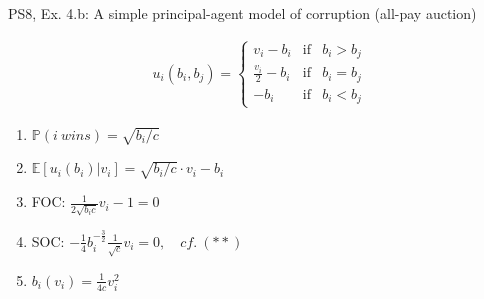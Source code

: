 \begin{frame}{PS8, Ex. 4.b: A simple principal-agent model of corruption (all-pay auction)}
\begin{multicols}{2}
\begin{align*}
        u_i(b_i,b_j)=\left\{\begin{array}{lcl}
          v_i-b_i           & \text{if} & b_i>b_j \\
          \frac{v_i}{2}-b_i & \text{if} & b_i=b_j \\
          -b_i              & \text{if} & b_i<b_j
        \end{array}\right.
      \end{align*} \vspace{-16pt}
      \begin{enumerate}
        \item $\mathbb{P}(i\ wins)=\sqrt{b_i/c}$
        \item $\mathbb{E}[u_i(b_i)|v_i]=\sqrt{b_i/c}\cdot v_i-b_i$
        \item FOC: $\frac{1}{2\sqrt{b_ic}}v_i-1=0$
        \item[] SOC: $-\frac{1}{4}b_i^{-\frac{3}{2}}\frac{1}{\sqrt{c}}v_i=0,\quad cf.\ (**)$
        \item $b_i(v_i)=\frac{1}{4c}v_i^2$
      \end{enumerate}
      \vfill\null
    \end{multicols}
\end{frame}
